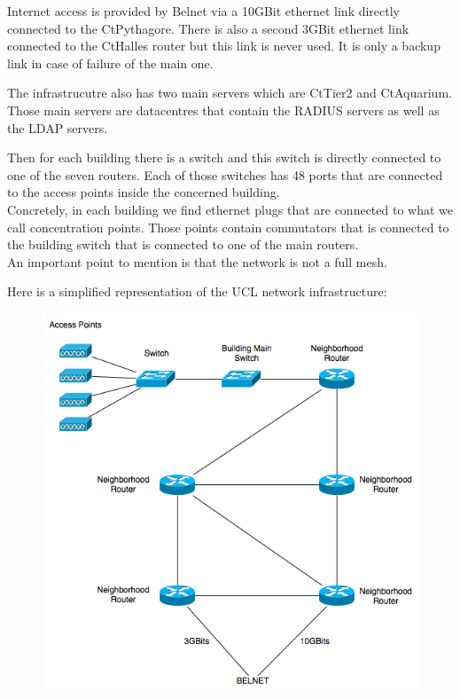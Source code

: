 Internet access is provided by Belnet via a 10GBit ethernet link directly connected to the CtPythagore. There is also a second 3GBit ethernet link connected to the CtHalles router but this link is never used. It is only a backup link in case of failure of the main one.

The infrastrucutre also has two main servers which are CtTier2 and CtAquarium. Those main servers are datacentres that contain the RADIUS servers as well as the LDAP servers.

Then for each building there is a switch and this switch is directly connected to one of the seven routers. Each of those switches has 48 ports that are connected to the access points inside the concerned building.\\
Concretely, in each building we find ethernet plugs that are connected to what we call concentration points. Those points contain commutators that is connected to the building switch that is connected to one of the main routers.\\
An important point to mention is that the network is not a full mesh.

Here is a simplified representation of the UCL network infrastructure:
\begin{figure}[H]
	\includegraphics[width=.9\linewidth]{Pictures/Chapter2/infrastructure.png}
\end{figure}

